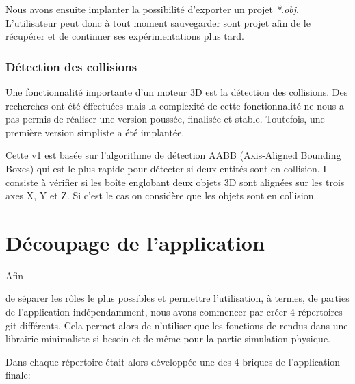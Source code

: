 \documentclass[11pt]{report}
\begin{document}
Nous avons ensuite implanter la possibilité d'exporter un projet \textit{*.obj}. L'utilisateur peut donc à tout moment sauvegarder sont projet afin de le récupérer et de continuer ses expérimentations plus tard.


\subsection{Détection des collisions}
Une fonctionnalité importante d'un moteur 3D est la détection des collisions. Des recherches ont été éffectuées mais la complexité de cette fonctionnalité ne nous a pas permis de réaliser une version poussée, finalisée et stable. Toutefois, une première version simpliste a été implantée.

Cette v1 est basée sur l'algorithme de détection AABB (Axis-Aligned Bounding Boxes) qui est le plus rapide pour détecter si deux entités sont en collision. Il consiste à vérifier si les boîte englobant deux objets 3D sont alignées sur les trois axes X, Y et Z. Si c'est le cas on considère que les objets sont en collision.



\chapter{Découpage de l'application}

\hypertarget{découpage}{Afin} de séparer les rôles le plus possibles et permettre l'utilisation, à termes, de parties de l'application
indépendamment, nous avons commencer par créer 4 répertoires git différents. Cela permet alors de n'utiliser que
les fonctions de rendus dans une librairie minimaliste si besoin et de même pour la partie simulation physique.\newline

Dans chaque répertoire était alors développée une des 4 briques de l'application finale:\newline
\end{document}
